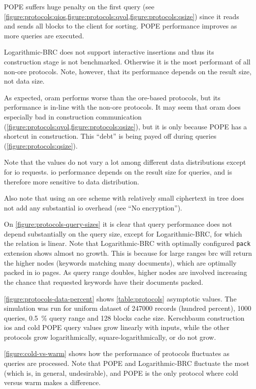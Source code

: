 			POPE suffers huge penalty on the first query (see \cref{figure:protocols:qios,figure:protocols:qvol,figure:protocols:qsize}) since it reads and sends all blocks to the client for sorting.
			POPE performance improves as more queries are executed.

			Logarithmic-BRC does not support interactive insertions and thus its construction stage is not benchmarked.
			Otherwise it is the most performant of all non-\acrshort{ore} protocols.
			Note, however, that its performance depends on the result size, not data size.

			As expected, \acrshort{oram} performs worse than the \acrshort{ore}-based protocols, but its performance is in-line with the non-\acrshort{ore} protocols.
			It may seem that \acrshort{oram} does especially bad in construction communication (\cref{figure:protocols:qvol,figure:protocols:qsize}), but it is only because POPE has a shortcut in construction.
			This ``debt'' is being payed off during queries (\cref{figure:protocols:qsize}).

			Note that the values do not vary a lot among different data distributions except for \acrshort{io} requests.
			\acrshort{io} performance depends on the result size for queries, and is therefore more sensitive to data distribution.

			Also note that using an \acrshort{ore} scheme with relatively small ciphertext in {\BPlus} tree does not add any substantial \acrshort{io} overhead (see ``No encryption'').

			On \cref{figure:protocols-query-sizes} it is clear that query performance does not depend substantially on the query size, except for Logarithmic-BRC, for which the relation is linear.
			Note that Logarithmic-BRC with optimally configured \texttt{pack} extension shows almost no growth.
			This is because for large ranges \acrshort{brc} will return the higher nodes (keywords matching many documents), which are optimally packed in \acrshort{io} pages.
			As query range doubles, higher nodes are involved increasing the chance that requested keywords have their documents packed.

			

			\cref{figure:protocols-data-percent} shows \cref{table:protocols} asymptotic values.
			The simulation was run for uniform dataset of \num{247000} records (hundred percent), \num{1000} queries, \SI{0.5}{\percent} query range and \num{128} blocks cache size.
			Kerschbaum construction \acrshort{io}s and cold POPE query values grow linearly with inputs, while the other protocols grow logarithmically, square-logarithmically, or do not grow.

			\cref{figure:cold-vs-warm} shows how the performance of protocols fluctuates as queries are processed.
			Note that POPE and Logarithmic-BRC fluctuate the most (which is, in general, undesirable), and POPE is the only protocol where cold versus warm makes a difference.
